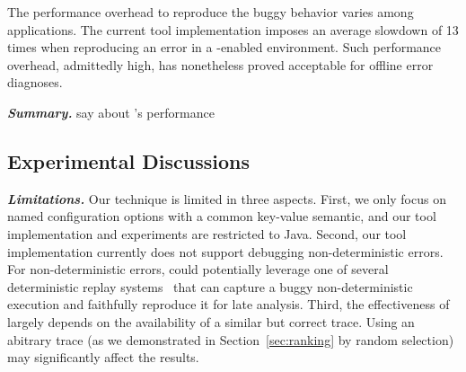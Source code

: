 The performance overhead to reproduce the buggy behavior varies
among applications. The current tool implementation
imposes an average slowdown of 13 times when reproducing
an error in a \ourtool-enabled environment.
Such performance overhead, admittedly high, has nonetheless proved acceptable
for offline error diagnoses.





\vspace{1mm}
\noindent \textbf{\textit{Summary.}} say about \ourtool's performance

\vspace{1mm}

\subsection{Experimental Discussions}


\noindent \textbf{\textit{Limitations.}} 
Our technique is limited in three aspects.
First, we only focus on named configuration options
with a common key-value semantic, and our tool implementation
and experiments are
restricted to Java. 
Second,  our tool implementation currently does not
support debugging non-deterministic errors. 
For non-deterministic errors, \ourtool could potentially leverage one of
several deterministic replay systems~\cite{Huang:2010:LLD}
that can capture a buggy non-deterministic
execution and faithfully reproduce it for late analysis.
Third, the effectiveness of \ourtool largely
depends on the availability of a similar but correct trace.
Using an abitrary trace (as we demonstrated in Section~\ref{sec:ranking}
by random selection) may significantly affect the results.







\vspace{1mm}

